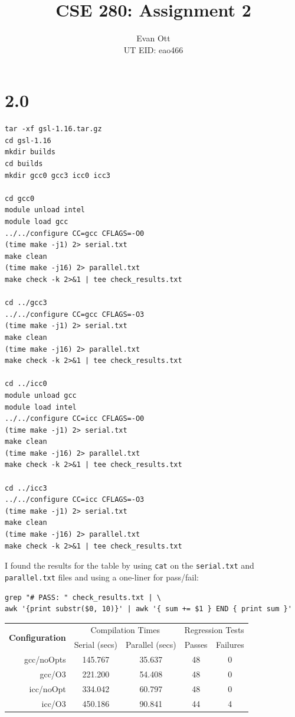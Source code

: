 \documentclass{article}
\title{\vspace{-6ex}CSE 280: Assignment 2\vspace{-2ex}}
\author{Evan Ott \\ UT EID: eao466\vspace{-2ex}}
\begin{document}
\maketitle
\section{2.0}
\begin{verbatim}
tar -xf gsl-1.16.tar.gz 
cd gsl-1.16
mkdir builds
cd builds
mkdir gcc0 gcc3 icc0 icc3

cd gcc0
module unload intel
module load gcc
../../configure CC=gcc CFLAGS=-O0
(time make -j1) 2> serial.txt
make clean
(time make -j16) 2> parallel.txt
make check -k 2>&1 | tee check_results.txt

cd ../gcc3
../../configure CC=gcc CFLAGS=-O3
(time make -j1) 2> serial.txt
make clean
(time make -j16) 2> parallel.txt
make check -k 2>&1 | tee check_results.txt

cd ../icc0
module unload gcc
module load intel
../../configure CC=icc CFLAGS=-O0
(time make -j1) 2> serial.txt
make clean
(time make -j16) 2> parallel.txt
make check -k 2>&1 | tee check_results.txt

cd ../icc3
../../configure CC=icc CFLAGS=-O3
(time make -j1) 2> serial.txt
make clean
(time make -j16) 2> parallel.txt
make check -k 2>&1 | tee check_results.txt
\end{verbatim}

I found the results for the table by using \texttt{cat} on the \texttt{serial.txt} and \texttt{parallel.txt} files and using
a one-liner for pass/fail:
\begin{verbatim}
grep "# PASS: " check_results.txt | \
awk '{print substr($0, 10)}' | awk '{ sum += $1 } END { print sum }'
\end{verbatim}


\begin{table}[h]
\centering
\begin{tabular}{r||c|c|c|c|}
\hline
\multirow{ 2}{*}{\textbf{Configuration}} & \multicolumn{2}{c|}{Compilation Times} & \multicolumn{2}{c|}{Regression Tests}\\
 & Serial (secs) & Parallel (secs) & Passes& Failures\\
\hline
gcc/noOpts & 145.767 & 35.637 & 48 & 0\\ \hline
gcc/O3 & 221.200 & 54.408 & 48 & 0\\ \hline
icc/noOpt & 334.042 & 60.797 & 48 & 0\\ \hline
icc/O3 & 450.186 & 90.841 & 44& 4\\ \hline
\end{tabular}
\end{table}
\end{document}

